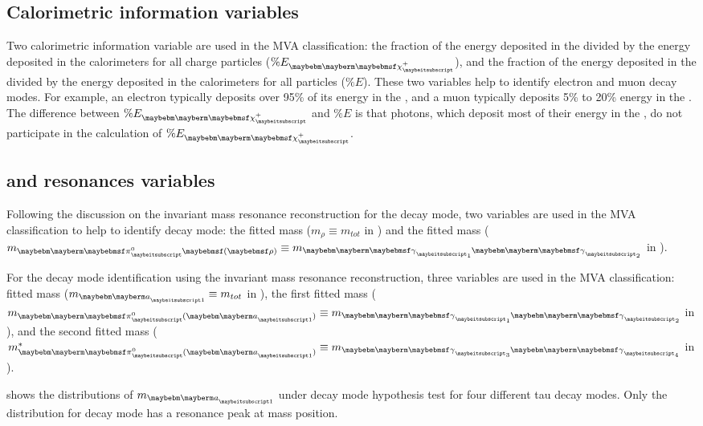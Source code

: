 \subsection{Calorimetric information variables}


Two calorimetric information variable are used in the MVA classification: the fraction of the energy  deposited in the \ECAL divided by the  energy deposited in the calorimeters for all charge particles ($\% E_{\charge}$), and the fraction of the energy  deposited in the \ECAL divided by the  energy deposited in the calorimeters for all particles ($\% E$). These  two variables help to identify electron and muon decay modes. For example, an electron typically deposits over 95\% of its energy in the \ECAL, and a muon typically deposits 5\% to 20\% energy in the \ECAL. The difference between $\% E_{\charge}$ and  $\% E$ is that photons, which deposit most of their energy in the \ECAL, do not participate in the calculation of $\% E_{\charge}$.

\subsection{\texorpdfstring{\decayRhoShort and \decayAiPhotonShort} \, resonances variables}

Following the discussion on the \Prho invariant mass resonance reconstruction for the \decayRhoShort  decay mode,  two variables are used in the MVA classification to help to identify  \decayRhoShort  decay mode: the fitted \Prho mass ($m_\rho \equiv m_{tot}$ in ) and the fitted \Ppizero mass ($m_{\Pgpz\parenths{\rho}} \equiv m_{\Pphoton_1\Pphoton_2}$ in  ).

For the \decayAiPhotonShort decay mode identification using the \Pai invariant mass resonance reconstruction, three variables are used in the MVA classification:  fitted \Pai mass ($m_{\Pai} \equiv m_{tot}$ in ), the first fitted \Ppizero mass ($m_{\Pgpz(\Pai)} \equiv m_{\Pphoton_1\Pphoton_2}$ in ), and the second fitted \Ppizero mass ($m^*_{\Pgpz(\Pai)} \equiv  m_{\Pphoton_3\Pphoton_4}$ in ).

  shows the distributions of  $m_{\Pai}$ under \decayAiPhotonShort decay mode hypothesis test for four different tau decay modes. Only the distribution for \decayAiPhotonShort decay mode has a resonance peak at \Pai mass position.


